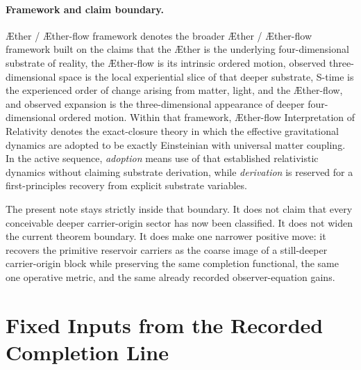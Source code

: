 \documentclass[11pt]{article}
\newcommand{\Aether}{\AE{}ther}
\newcommand{\Aflow}{\AE{}ther-flow}
\newcommand{\TheoryName}{\Aflow{} Interpretation of Relativity}
\newcommand{\TheoryProgram}{\Aether{} / \Aflow{} framework}
\begin{document}
\paragraph{Framework and claim boundary.}
\TheoryProgram{} denotes the broader \Aether{} / \Aflow{} framework built on the claims that the \Aether{} is the underlying four-dimensional substrate of reality, the \Aflow{} is its intrinsic ordered motion, observed three-dimensional space is the local experiential slice of that deeper substrate, S-time is the experienced order of change arising from matter, light, and the \Aflow{}, and observed expansion is the three-dimensional appearance of deeper four-dimensional ordered motion. Within that framework, \TheoryName{} denotes the exact-closure theory in which the effective gravitational dynamics are adopted to be exactly Einsteinian with universal matter coupling. In the active sequence, \emph{adoption} means use of that established relativistic dynamics without claiming substrate derivation, while \emph{derivation} is reserved for a first-principles recovery from explicit substrate variables.

The present note stays strictly inside that boundary. It does not claim that every conceivable deeper carrier-origin sector has now been classified. It does not widen the current theorem boundary. It does make one narrower positive move: it recovers the primitive reservoir carriers as the coarse image of a still-deeper carrier-origin block while preserving the same completion functional, the same one operative metric, and the same already recorded observer-equation gains.

\section{Fixed Inputs from the Recorded Completion Line}
\end{document}

